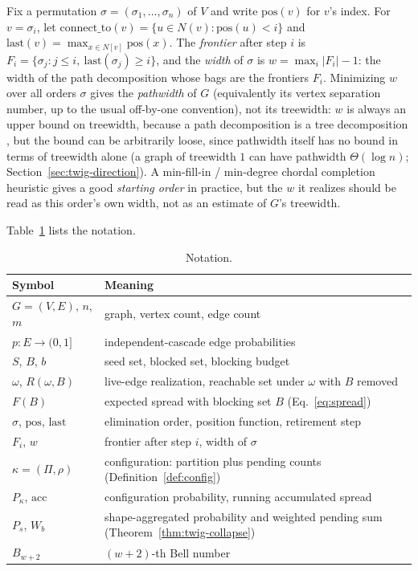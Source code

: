 \documentclass[preprint,11pt]{elsarticle}
\theoremstyle{definition}
\theoremstyle{remark}
\newcommand{\up}{\rule{0pt}{2.6ex}}
\newcommand{\down}{\rule[-1.2ex]{0pt}{0pt}}
\newcommand{\Rspread}{R}
\newcommand{\FF}{F}
\begin{document}
Fix a
permutation $\sigma=(\sigma_1,\dots,\sigma_n)$ of $V$ and write
$\mathrm{pos}(v)$ for $v$'s index. For $v=\sigma_i$, let
$\mathrm{connect\_to}(v)=\{u\in N(v):\mathrm{pos}(u)<i\}$ and
$\mathrm{last}(v)=\max_{x\in N[v]}\mathrm{pos}(x)$. The \emph{frontier}
after step $i$ is $F_i=\{\sigma_j:j\le i,\ \mathrm{last}(\sigma_j)\ge i\}$,
and the \emph{width} of $\sigma$ is $w=\max_i|F_i|-1$: the width of the path decomposition whose bags are the frontiers $F_i$. Minimizing $w$ over all orders $\sigma$
gives the \emph{pathwidth} of $G$ \citep{kinnersley1992} (equivalently its vertex separation number, up to the usual off-by-one convention), not its
treewidth: $w$ is always an upper bound on treewidth, because a path decomposition is a tree decomposition
\citep{bodlaender1988,cygan2015}, but the bound can be arbitrarily loose,
since pathwidth itself has no bound in terms of treewidth alone (a graph
of treewidth $1$ can have pathwidth $\Theta(\log n)$;
Section~\ref{sec:twig-direction}). A min-fill-in / min-degree chordal
completion heuristic \citep{bodlaender1988,cygan2015} gives a good
\emph{starting order} in practice, but the $w$ it realizes should be read
as this order's own width, not as an estimate of $G$'s treewidth.

Table~\ref{tab:notation} lists the notation.

\begin{table}[h]
\centering
\caption{Notation.}\label{tab:notation}
\small
\begin{tabular}{@{}ll@{}}
\hline
\up Symbol & Meaning \\
\hline
\up $G=(V,E)$, $n$, $m$ & graph, vertex count, edge count \\
$p:E\to(0,1]$ & independent-cascade edge probabilities \\
$S$, $B$, $b$ & seed set, blocked set, blocking budget \\
$\omega$, $\Rspread(\omega,B)$ & live-edge realization, reachable set under $\omega$ with $B$ removed \\
$\FF(B)$ & expected spread with blocking set $B$ (Eq.~\ref{eq:spread}) \\
$\sigma$, $\mathrm{pos}$, $\mathrm{last}$ & elimination order, position function, retirement step \\
$F_i$, $w$ & frontier after step $i$, width of $\sigma$ \\
$\kappa=(\Pi,\rho)$ & configuration: partition plus pending counts (Definition~\ref{def:config}) \\
$P_\kappa$, $\mathrm{acc}$ & configuration probability, running accumulated spread \\
$P_s$, $W_b$ & shape-aggregated probability and weighted pending sum (Theorem~\ref{thm:twig-collapse}) \\
\down $B_{w+2}$ & $(w+2)$-th Bell number \\
\hline
\end{tabular}
\end{table}
\end{document}
